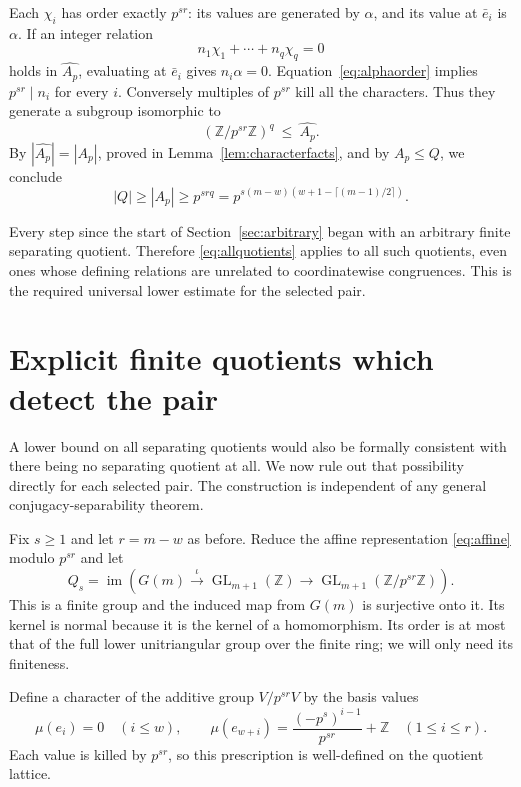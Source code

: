 \documentclass[11pt]{article}
\numberwithin{equation}{section}
\theoremstyle{definition}
\theoremstyle{remark}
\newcommand{\Z}{\mathbb Z}
\newcommand{\GL}{\operatorname{GL}}
\newcommand{\im}{\operatorname{im}}
\begin{document}
Each $\chi_i$ has order exactly $p^{sr}$: its values are generated by $\alpha$, and its value at $\bar e_i$ is $\alpha$. If an integer relation
\[
n_1\chi_1+\cdots+n_q\chi_q=0
\]
holds in $\widehat{A_p}$, evaluating at $\bar e_i$ gives $n_i\alpha=0$. Equation~\eqref{eq:alphaorder} implies $p^{sr}\mid n_i$ for every $i$. Conversely multiples of $p^{sr}$ kill all the characters. Thus they generate a subgroup isomorphic to
\[
(\Z/p^{sr}\Z)^q\ \le\ \widehat{A_p}.
\]
By $|\widehat{A_p}|=|A_p|$, proved in Lemma~\ref{lem:characterfacts}, and by $A_p\le Q$, we conclude
\begin{equation}\label{eq:allquotients}
|Q|\ge|A_p|\ge p^{srq}
=p^{s(m-w)(w+1-\lceil(m-1)/2\rceil)}.
\end{equation}

Every step since the start of Section~\ref{sec:arbitrary} began with an arbitrary finite separating quotient. Therefore \eqref{eq:allquotients} applies to all such quotients, even ones whose defining relations are unrelated to coordinatewise congruences. This is the required universal lower estimate for the selected pair.

\section{Explicit finite quotients which detect the pair}\label{sec:detector}
A lower bound on all separating quotients would also be formally consistent with there being no separating quotient at all. We now rule out that possibility directly for each selected pair. The construction is independent of any general conjugacy-separability theorem.

Fix $s\ge1$ and let $r=m-w$ as before. Reduce the affine representation \eqref{eq:affine} modulo $p^{sr}$ and let
\begin{equation}\label{eq:Qs}
Q_s=\im\left(G(m)\xrightarrow{\ \iota\ }\GL_{m+1}(\Z)
\longrightarrow\GL_{m+1}(\Z/p^{sr}\Z)\right).
\end{equation}
This is a finite group and the induced map from $G(m)$ is surjective onto it. Its kernel is normal because it is the kernel of a homomorphism. Its order is at most that of the full lower unitriangular group over the finite ring; we will only need its finiteness.

Define a character of the additive group $V/p^{sr}V$ by the basis values
\begin{equation}\label{eq:mu}
\mu(e_i)=0\quad(i\le w),\qquad
\mu(e_{w+i})=\frac{(-p^s)^{i-1}}{p^{sr}}+\Z\quad(1\le i\le r).
\end{equation}
Each value is killed by $p^{sr}$, so this prescription is well-defined on the quotient lattice.
\end{document}
